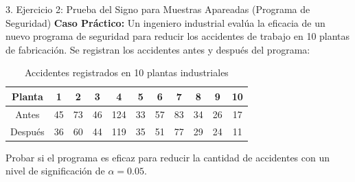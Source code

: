 \documentclass[11pt,a4paper]{article}
\begin{document}
\begin{subsection}{3. Ejercicio 2: Prueba del Signo para Muestras Apareadas (Programa de Seguridad)}
    \textbf{Caso Práctico:} Un ingeniero industrial evalúa la eficacia de un nuevo programa de seguridad para reducir los accidentes de trabajo en 10 plantas de fabricación. Se registran los accidentes antes y después del programa:
    \begin{table}[h!]
        \centering
        \caption{Accidentes registrados en 10 plantas industriales}
        \begin{tabular}{ccccccccccc}
            \toprule
            \textbf{Planta} & \textbf{1} & \textbf{2} & \textbf{3} & \textbf{4} & \textbf{5} & \textbf{6} & \textbf{7} & \textbf{8} & \textbf{9} & \textbf{10} \\
            \midrule
            Antes & 45 & 73 & 46 & 124 & 33 & 57 & 83 & 34 & 26 & 17 \\
            Después & 36 & 60 & 44 & 119 & 35 & 51 & 77 & 29 & 24 & 11 \\
            \bottomrule
        \end{tabular}
    \end{table}
    Probar si el programa es eficaz para reducir la cantidad de accidentes con un nivel de significación de $\alpha = 0.05$.


\end{subsection}
\end{document}
